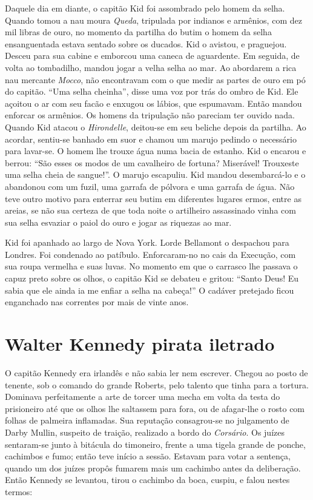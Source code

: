Daquele dia em diante, o capitão Kid foi assombrado pelo homem da selha.
Quando tomou a nau moura \textit{Queda}, tripulada por indianos e
armênios, com dez mil libras de ouro, no momento da partilha do butim o
homem da selha ensanguentada estava sentado sobre os ducados. Kid o
avistou, e praguejou. Desceu para sua cabine e emborcou uma caneca de
aguardente. Em seguida, de volta ao tombadilho, mandou jogar a velha selha
ao mar. Ao abordarem a rica nau mercante \textit{Mocco}, não encontravam
com o que medir as partes de ouro em pó do capitão. “Uma selha cheinha”,
disse uma voz por trás do ombro de Kid. Ele açoitou o ar com seu facão e
enxugou os lábios, que espumavam. Então mandou enforcar os armênios. Os
homens da tripulação não pareciam ter ouvido nada. Quando Kid atacou o
\textit{Hirondelle}, deitou-se em seu beliche depois da partilha. Ao
acordar, sentiu-se banhado em suor e chamou um marujo pedindo o necessário
para lavar-se. O homem lhe trouxe água numa bacia de estanho. Kid o
encarou e berrou: “São esses os modos de um cavalheiro de fortuna?
Miserável! Trouxeste uma selha cheia de sangue!”. O marujo escapuliu. Kid
mandou desembarcá-lo e o abandonou com um fuzil, uma garrafa de pólvora e
uma garrafa de água. Não teve outro motivo para enterrar seu butim em
diferentes lugares ermos, entre as areias, se não sua certeza de que toda
noite o artilheiro assassinado vinha com sua selha esvaziar o paiol do
ouro e jogar as riquezas ao mar.

Kid foi apanhado ao largo de Nova York. Lorde Bellamont o despachou para
Londres. Foi condenado ao patíbulo. Enforcaram-no no cais da Execução, com
sua roupa vermelha e suas luvas. No momento em que o carrasco lhe passava
o capuz preto sobre os olhos, o capitão Kid se debateu e gritou: “Santo
Deus! Eu sabia que ele ainda ia me enfiar a selha na cabeça!” O cadáver
pretejado ficou enganchado nas correntes por mais de vinte anos.

\chapter{Walter Kennedy pirata iletrado}

O capitão Kennedy era irlandês e não sabia ler nem escrever. Chegou ao
posto de tenente, sob o comando do grande Roberts, pelo talento que tinha
para a tortura. Dominava perfeitamente a arte de torcer uma mecha em volta
da testa do prisioneiro até que os olhos lhe saltassem para fora, ou de
afagar-lhe o rosto com folhas de palmeira inflamadas. Sua reputação
consagrou-se no julgamento de Darby Mullin, suspeito de traição, realizado
a bordo do \textit{Corsário}. Os juízes sentaram-se junto à bitácula do
timoneiro, frente a uma tigela grande de ponche, cachimbos e fumo; então
teve início a sessão. Estavam para votar a sentença, quando um dos juízes
propôs fumarem mais um cachimbo antes da deliberação. Então Kennedy se
levantou, tirou o cachimbo da boca, cuspiu, e falou nestes termos:

